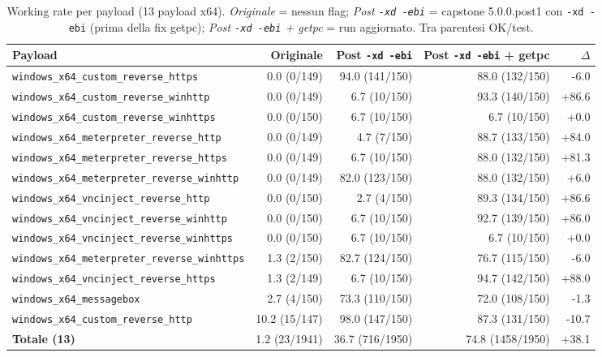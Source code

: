 \documentclass[11pt]{article}
\begin{document}
\begin{table}[htbp]
\centering
\small
\caption{Working rate per payload (13 payload x64). \emph{Originale} = nessun
         flag; \emph{Post \texttt{-xd -ebi}} = capstone 5.0.0.post1 con
         \texttt{-xd -ebi} (prima della fix getpc); \emph{Post \texttt{-xd -ebi}
         + getpc} = run aggiornato. Tra parentesi OK/test.}
\label{tab:working_rate_payloads}
\begin{tabular}{lrrrr}
\toprule
Payload & Originale & Post \texttt{-xd -ebi} & Post \texttt{-xd -ebi} + getpc & $\Delta$ \\
\midrule
\texttt{windows\_x64\_custom\_reverse\_https} & 0.0 (0/149) & 94.0 (141/150) & 88.0 (132/150) & -6.0 \\
\texttt{windows\_x64\_custom\_reverse\_winhttp} & 0.0 (0/149) & 6.7 (10/150) & 93.3 (140/150) & +86.6 \\
\texttt{windows\_x64\_custom\_reverse\_winhttps} & 0.0 (0/150) & 6.7 (10/150) & 6.7 (10/150) & +0.0 \\
\texttt{windows\_x64\_meterpreter\_reverse\_http} & 0.0 (0/149) & 4.7 (7/150) & 88.7 (133/150) & +84.0 \\
\texttt{windows\_x64\_meterpreter\_reverse\_https} & 0.0 (0/149) & 6.7 (10/150) & 88.0 (132/150) & +81.3 \\
\texttt{windows\_x64\_meterpreter\_reverse\_winhttp} & 0.0 (0/149) & 82.0 (123/150) & 88.0 (132/150) & +6.0 \\
\texttt{windows\_x64\_vncinject\_reverse\_http} & 0.0 (0/150) & 2.7 (4/150) & 89.3 (134/150) & +86.6 \\
\texttt{windows\_x64\_vncinject\_reverse\_winhttp} & 0.0 (0/150) & 6.7 (10/150) & 92.7 (139/150) & +86.0 \\
\texttt{windows\_x64\_vncinject\_reverse\_winhttps} & 0.0 (0/150) & 6.7 (10/150) & 6.7 (10/150) & +0.0 \\
\texttt{windows\_x64\_meterpreter\_reverse\_winhttps} & 1.3 (2/150) & 82.7 (124/150) & 76.7 (115/150) & -6.0 \\
\texttt{windows\_x64\_vncinject\_reverse\_https} & 1.3 (2/149) & 6.7 (10/150) & 94.7 (142/150) & +88.0 \\
\texttt{windows\_x64\_messagebox} & 2.7 (4/150) & 73.3 (110/150) & 72.0 (108/150) & -1.3 \\
\texttt{windows\_x64\_custom\_reverse\_http} & 10.2 (15/147) & 98.0 (147/150) & 87.3 (131/150) & -10.7 \\
\midrule
\textbf{Totale (13)} & 1.2 (23/1941) & 36.7 (716/1950) & 74.8 (1458/1950) & +38.1 \\
\bottomrule
\end{tabular}
\end{table}
\end{document}
